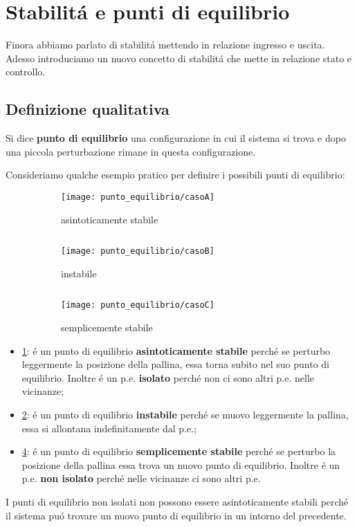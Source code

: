\documentclass[../main.tex]{subfiles}
\begin{document}
	\newcommand{\pe}[1]{\hat{\underline #1}}
	\section{Stabilit\'a e punti di equilibrio}
		Finora abbiamo parlato di stabilit\'a mettendo in relazione ingresso e uscita. Adesso introduciamo un nuovo concetto di stabilit\'a che mette in relazione stato e controllo.
		
	\subsection{Definizione qualitativa}
		Si dice \textbf{punto di equilibrio} una configurazione in cui il sistema si trova e dopo una piccola perturbazione rimane in questa configurazione.
		
		Consideriamo qualche esempio pratico per definire i possibili punti di equilibrio:
		\begin{figure}[H]
			\centering
			\begin{subfigure}{0.24\textwidth}
				\texttt{[image: punto\_equilibrio/casoA]}
				\caption{asintoticamente stabile}
				\label{fig:asint_stab}
			\end{subfigure}
			$\;\;\;\;\;\;$
			\centering
			\begin{subfigure}{0.24\textwidth}
				\texttt{[image: punto\_equilibrio/casoB]}
				\caption{instabile}
				\label{fig:instabile}
			\end{subfigure}
			$\;\;\;\;\;\;$
			\centering
			\begin{subfigure}{0.24\textwidth}
				\texttt{[image: punto\_equilibrio/casoC]}
				\caption{semplicemente stabile}
				\label{fig:sempl_stab}
			\end{subfigure}
			\caption{}
		\end{figure}
	
		\begin{itemize}
			\item
				\ref{fig:asint_stab}: \'e un punto di equilibrio \textbf{asintoticamente stabile} perch\'e se perturbo leggermente la posizione della pallina, essa torna subito nel suo punto di equilibrio. Inoltre \'e un p.e. \textbf{isolato} perch\'e non ci sono altri p.e. nelle vicinanze;
			\item
				\ref{fig:instabile}: \'e un punto di equilibrio \textbf{instabile} perch\'e se muovo leggermente la pallina, essa si allontana indefinitamente dal p.e.;
			\item
				\ref{fig:sempl_stab}: \'e un punto di equilibrio \textbf{semplicemente stabile} perch\'e se perturbo la posizione della pallina essa trova un nuovo punto di equilibrio. Inoltre \'e un p.e. \textbf{non isolato} perch\'e nelle vicinanze ci sono altri p.e.
		\end{itemize}
		I punti di equilibrio non isolati non possono essere asintoticamente stabili perch\'e il sistema pu\'o trovare un nuovo punto di equilibrio in un intorno del precedente.
		
\end{document}
